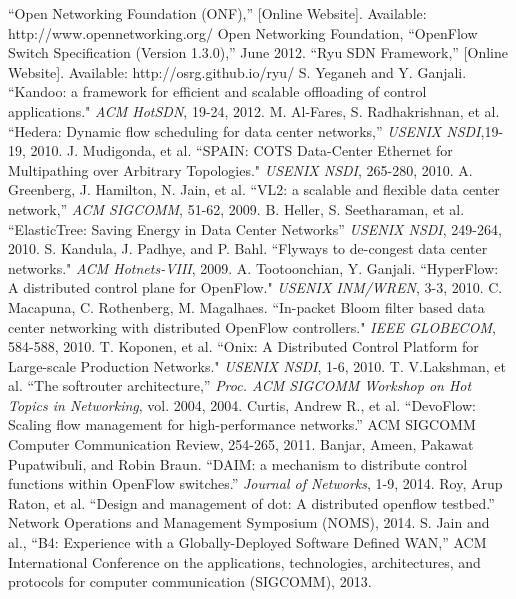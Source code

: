 \documentclass[cs4size, a4paer, oneside, openany, nocap]{sjtuthesis}
\begin{document}
\begin{thebibliography}{1}
 ``Open Networking Foundation (ONF),'' [Online Website]. Available: http://www.opennetworking.org/
 Open Networking Foundation, ``OpenFlow Switch Specification (Version 1.3.0),'' June 2012.
 ``Ryu SDN Framework,'' [Online Website]. Available: http://osrg.github.io/ryu/
S. Yeganeh and Y. Ganjali. ``Kandoo: a framework for efficient and scalable offloading of control applications." \emph{ACM HotSDN}, 19-24, 2012.
M. Al-Fares, S. Radhakrishnan, et al. ``Hedera: Dynamic flow scheduling for data center networks,'' \emph{USENIX NSDI},19-19, 2010.
J. Mudigonda, et al. ``SPAIN: COTS Data-Center Ethernet for Multipathing over Arbitrary Topologies." \emph{USENIX NSDI}, 265-280, 2010.
A. Greenberg, J. Hamilton, N. Jain, et al. ``VL2: a scalable and flexible data center network,'' \emph{ACM SIGCOMM}, 51-62, 2009.
B. Heller, S. Seetharaman, et al. ``ElasticTree: Saving Energy in Data Center Networks'' \emph{USENIX NSDI}, 249-264, 2010.
S. Kandula, J. Padhye, and P. Bahl. ``Flyways to de-congest data center networks." \emph{ACM Hotnets-VIII}, 2009.
A. Tootoonchian, Y. Ganjali. ``HyperFlow: A distributed control plane for OpenFlow." \emph{USENIX INM/WREN}, 3-3, 2010.
C. Macapuna, C. Rothenberg, M. Magalhaes. ``In-packet Bloom filter based data center networking with distributed OpenFlow controllers." \emph{IEEE GLOBECOM}, 584-588, 2010.
T. Koponen, et al. ``Onix: A Distributed Control Platform for Large-scale Production Networks." \emph{USENIX NSDI}, 1-6, 2010.
T. V.Lakshman, et al. ``The softrouter architecture,'' \emph{Proc. ACM SIGCOMM Workshop on Hot Topics in Networking}, vol. 2004, 2004.
 Curtis, Andrew R., et al. ``DevoFlow: Scaling flow management for high-performance networks.'' ACM SIGCOMM Computer Communication Review, 254-265, 2011.
 Banjar, Ameen, Pakawat Pupatwibuli, and Robin Braun. ``DAIM: a mechanism to distribute control functions within OpenFlow switches.'' \emph{Journal of Networks}, 1-9, 2014.
 Roy, Arup Raton, et al. ``Design and management of dot: A distributed openflow testbed.'' Network Operations and Management Symposium (NOMS), 2014.
 S. Jain and al., ``B4: Experience with a Globally-Deployed Software Defined WAN,'' ACM International Conference on the applications, technologies, architectures, and protocols for computer communication (SIGCOMM), 2013.
\end{thebibliography}

% 



%

%

%
\end{document}
